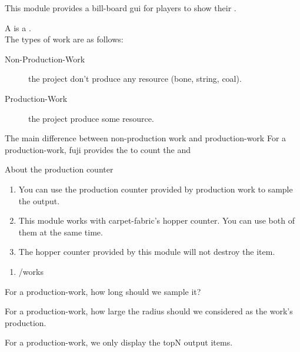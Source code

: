 
This module provides a bill-board gui for players to show their .

A  is a . \\
The types of work are as follows:
\begin{description}
    \item [Non-Production-Work] the project don't produce any resource (\eg bone, string, coal).
    \item[Production-Work] the project produce some resource.
\end{description}

\begin{note}{The main difference between non-production work and production-work}
    For a production-work, fuji provides the  to count the  and 
\end{note}

\begin{tips}{About the production counter}
    \begin{enumerate}
        \item You can use the production counter provided by production work to sample the output.
        \item {This module works with carpet-fabric's hopper counter. You can use both of them at the same time.}
        \item The hopper counter provided by this module will not destroy the item.
    \end{enumerate}

\end{tips}

\begin{enumerate}
    \item /works
\end{enumerate}

\begin{Configuration}
    \item[sample\_time\_ms]{
        For a production-work, how long should we sample it?
    }
    \item[sample\_distance\_limit]{
        For a production-work, how large the radius should we considered as the work's production.
    }
    \item[sample\_counter\_top\_n]{
        For a production-work, we only display the topN output items.
    }
\end{Configuration}








